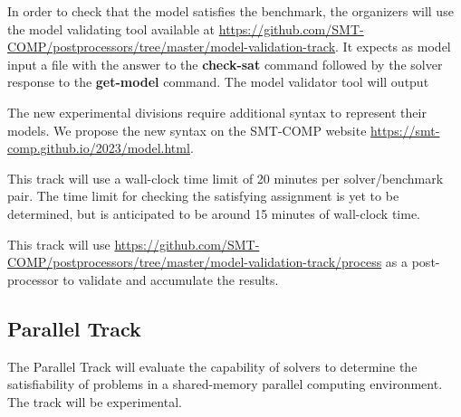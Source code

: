 \documentclass[12pt]{article}
\newcommand{\akey}[1]{\textbf{#1}\xspace}
\newcommand{\paralleltrack}{Parallel Track\xspace}
\begin{document}
In order to check that the model satisfies the benchmark, the organizers will
use the model validating tool available at
{\url{https://github.com/SMT-COMP/postprocessors/tree/master/model-validation-track}}.
It expects as model input a file with the answer to the \akey{check-sat}
command followed by the solver response to the \akey{get-model} command.
The model validator tool will output

The new experimental divisions require additional syntax to represent
their models.  We propose the new syntax on the SMT-COMP website
{\url{https://smt-comp.github.io/2023/model.html}}.

This track will use a wall-clock time limit of 20 minutes per solver/benchmark
pair. The time limit for checking the satisfying assignment is yet to be
determined, but is anticipated to be around 15 minutes of wall-clock time.

This track will use
{\url{https://github.com/SMT-COMP/postprocessors/tree/master/model-validation-track/process}}
as a post-processor
to validate and accumulate the results.


\subsection{\paralleltrack{}}
The \paralleltrack{} will evaluate the capability of solvers to
determine the satisfiability of problems in a shared-memory parallel
computing environment.  The track will be experimental.
\end{document}
